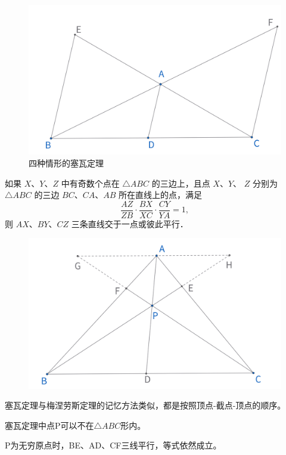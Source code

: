 \begin{figure}[H]
\begin{minipage}[t]{0.2\textwidth}
    \end{minipage}
    \begin{minipage}[t]{0.2\textwidth}
    \centering
    \includegraphics[width=\linewidth]{figures/ceva4.png}
    \end{minipage}
    \caption{四种情形的塞瓦定理}
\end{figure}


\begin{theorem}
如果 $X 、 Y 、 Z$ 中有奇数个点在 $\triangle A B C$ 的三边上，且点 $X 、 Y 、$ $Z$ 分别为 $\triangle A B C$ 的三边 $B C 、 C A 、 A B$ 所在直线上的点，满足 
$$\frac{A Z}{Z B} \cdot \frac{B X}{X C} \cdot \frac{C Y}{Y A}=1,$$
则 $A X 、 B Y 、 C Z$ 三条直线交于一点或彼此平行．
\end{theorem}


\begin{figure}[H]
    \centering
    \includegraphics[width=0.6\linewidth]{figures/ceva-proof1.png}
\end{figure}
\begin{remark}
    塞瓦定理与梅涅劳斯定理的记忆方法类似，都是按照顶点-截点-顶点的顺序。

    塞瓦定理中点P可以不在$\triangle ABC$形内。
    
    P为无穷原点时，BE、AD、CF三线平行，等式依然成立。

    
\end{remark}


